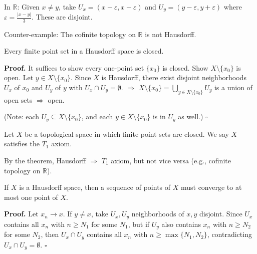 \documentclass[11pt]{report}
\renewenvironment{proof}[1][Proof]{\noindent\textbf{#1.} }{\hfill$\square$\par\vspace{5pt}}
\begin{document}
\begin{exbox}
In $\mathbb{R}$: Given $x \neq y$, take $U_x = (x - \varepsilon, x + \varepsilon)$ and $U_y = (y - \varepsilon, y + \varepsilon)$ where $\varepsilon = \frac{|x-y|}{3}$. These are disjoint.

Counter-example: The cofinite topology on $\mathbb{R}$ is not Hausdorff.
\end{exbox}

\begin{thmbox}
Every finite point set in a Hausdorff space is closed.
\end{thmbox}

\begin{proof}
It suffices to show every one-point set $\{x_0\}$ is closed. Show $X \setminus \{x_0\}$ is open. Let $y \in X \setminus \{x_0\}$. Since $X$ is Hausdorff, there exist disjoint neighborhoods $U_x$ of $x_0$ and $U_y$ of $y$ with $U_x \cap U_y = \emptyset$. $\Rightarrow$ $X \setminus \{x_0\} = \bigcup_{y \in X \setminus \{x_0\}} U_y$ is a union of open sets $\Rightarrow$ open.

(Note: each $U_y \subseteq X \setminus \{x_0\}$, and each $y \in X \setminus \{x_0\}$ is in $U_y$ as well.)
\end{proof}

\begin{propbox}[$T_1$ Axiom]
Let $X$ be a topological space in which finite point sets are closed. We say $X$ satisfies the $T_1$ axiom.

By the theorem, Hausdorff $\Rightarrow$ $T_1$ axiom, but not vice versa (e.g., cofinite topology on $\mathbb{R}$).
\end{propbox}

\begin{thmbox}
If $X$ is a Hausdorff space, then a sequence of points of $X$ must converge to at most one point of $X$.
\end{thmbox}

\begin{proof}
Let $x_n \to x$. If $y \neq x$, take $U_x, U_y$ neighborhoods of $x, y$ disjoint. Since $U_x$ contains all $x_n$ with $n \geq N_1$ for some $N_1$, but if $U_y$ also contains $x_n$ with $n \geq N_2$ for some $N_2$, then $U_x \cap U_y$ contains all $x_n$ with $n \geq \max\{N_1, N_2\}$, contradicting $U_x \cap U_y = \emptyset$.
\end{proof}

\end{document}
